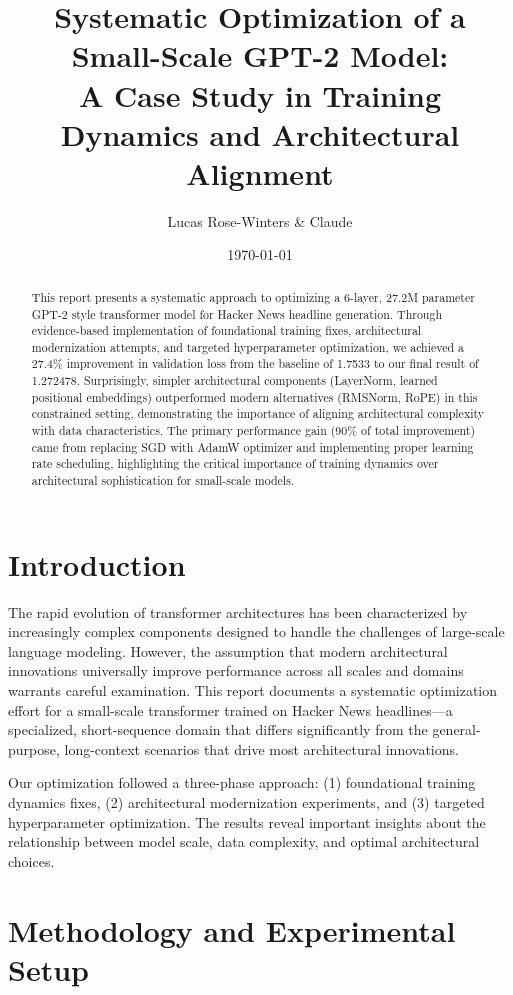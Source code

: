 \documentclass[11pt,a4paper]{article}
\title{\textbf{Systematic Optimization of a Small-Scale GPT-2 Model:\\A Case Study in Training Dynamics and Architectural Alignment}}
\author{Lucas Rose-Winters \& Claude}
\date{\today}
\begin{document}
\maketitle

\begin{abstract}
This report presents a systematic approach to optimizing a 6-layer, 27.2M parameter GPT-2 style transformer model for Hacker News headline generation. Through evidence-based implementation of foundational training fixes, architectural modernization attempts, and targeted hyperparameter optimization, we achieved a 27.4\% improvement in validation loss from the baseline of 1.7533 to our final result of 1.272478. Surprisingly, simpler architectural components (LayerNorm, learned positional embeddings) outperformed modern alternatives (RMSNorm, RoPE) in this constrained setting, demonstrating the importance of aligning architectural complexity with data characteristics. The primary performance gain (90\% of total improvement) came from replacing SGD with AdamW optimizer and implementing proper learning rate scheduling, highlighting the critical importance of training dynamics over architectural sophistication for small-scale models.
\end{abstract}

\section{Introduction}

The rapid evolution of transformer architectures has been characterized by increasingly complex components designed to handle the challenges of large-scale language modeling. However, the assumption that modern architectural innovations universally improve performance across all scales and domains warrants careful examination. This report documents a systematic optimization effort for a small-scale transformer trained on Hacker News headlines—a specialized, short-sequence domain that differs significantly from the general-purpose, long-context scenarios that drive most architectural innovations.

Our optimization followed a three-phase approach: (1) foundational training dynamics fixes, (2) architectural modernization experiments, and (3) targeted hyperparameter optimization. The results reveal important insights about the relationship between model scale, data complexity, and optimal architectural choices.

\section{Methodology and Experimental Setup}
\end{document}
